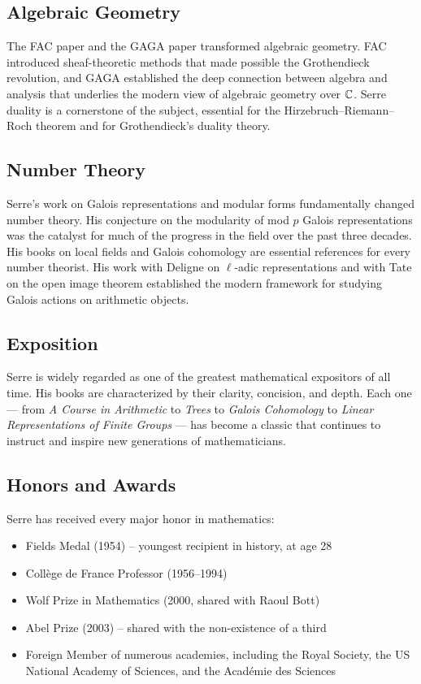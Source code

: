\subsection{Algebraic Geometry}

The FAC paper and the GAGA paper transformed algebraic geometry. FAC introduced sheaf-theoretic methods that made possible the Grothendieck revolution, and GAGA established the deep connection between algebra and analysis that underlies the modern view of algebraic geometry over \(\mathbb{C}\). Serre duality is a cornerstone of the subject, essential for the Hirzebruch--Riemann--Roch theorem and for Grothendieck's duality theory.

\subsection{Number Theory}

Serre's work on Galois representations and modular forms fundamentally changed number theory. His conjecture on the modularity of mod \(p\) Galois representations was the catalyst for much of the progress in the field over the past three decades. His books on local fields and Galois cohomology are essential references for every number theorist. His work with Deligne on \(\ell\)-adic representations and with Tate on the open image theorem established the modern framework for studying Galois actions on arithmetic objects.

\subsection{Exposition}

Serre is widely regarded as one of the greatest mathematical expositors of all time. His books are characterized by their clarity, concision, and depth. Each one --- from \textit{A Course in Arithmetic} to \textit{Trees} to \textit{Galois Cohomology} to \textit{Linear Representations of Finite Groups} --- has become a classic that continues to instruct and inspire new generations of mathematicians.

\subsection{Honors and Awards}

Serre has received every major honor in mathematics:
\begin{itemize}
    \item Fields Medal (1954) -- youngest recipient in history, at age 28
    \item Coll\`ege de France Professor (1956--1994)
    \item Wolf Prize in Mathematics (2000, shared with Raoul Bott)
    \item Abel Prize (2003) -- shared with the non-existence of a third
    \item Foreign Member of numerous academies, including the Royal Society, the US National Academy of Sciences, and the Acad\'emie des Sciences
\end{itemize}

